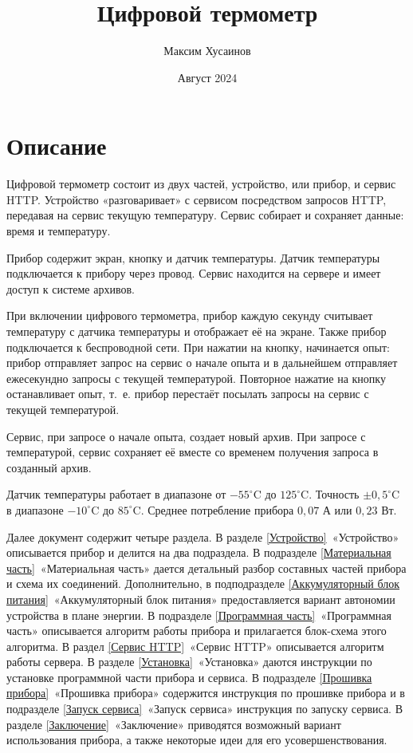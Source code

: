 \documentclass[12pt]{extarticle}
\title{Цифровой термометр}
\date{Август 2024}
\author{Максим Хусаинов}
\begin{document}
\maketitle

\section{Описание}
Цифровой термометр состоит из двух частей, устройство, или прибор, и сервис HTTP. Устройство «разговаривает» с сервисом посредством запросов HTTP, передавая на сервис текущую температуру. Сервис собирает и сохраняет данные: время и температуру.

Прибор содержит экран, кнопку и датчик температуры. Датчик температуры подключается к прибору через провод. Сервис находится на сервере и имеет доступ к системе архивов.

При включении цифрового термометра, прибор каждую секунду считывает температуру с датчика температуры и отображает её на экране. Также прибор подключается к беспроводной сети. При нажатии на кнопку, начинается опыт: прибор отправляет запрос на сервис о начале опыта и в дальнейшем отправляет ежесекундно запросы с текущей температурой. Повторное нажатие на кнопку останавливает опыт, т.~е. прибор перестаёт посылать запросы на сервис с текущей температурой.

Сервис, при запросе о начале опыта, создает новый архив. При запросе с температурой, сервис сохраняет её вместе со временем получения запроса в созданный архив.

Датчик температуры работает в диапазоне от $-55^{\circ}$C до $125^{\circ}$C. Точность $\pm 0{,}5^{\circ}$C в диапазоне $-10^{\circ}$C до $85^{\circ}$C. 
Среднее потребление прибора $0{,}07$ А или $0{,}23$ Вт.

Далее документ содержит четыре раздела. В разделе \ref{Устройство}~«Устройство» описывается прибор и делится на два подраздела. В подразделе \ref{Материальная часть}~«Материальная часть» дается детальный разбор составных частей прибора и схема их соединений. Дополнительно, в подподразделе \ref{Аккумуляторный блок питания}~«Аккумуляторный блок питания» предоставляется вариант автономии устройства в плане энергии. В подразделе \ref{Программная часть}~«Программная часть» описывается алгоритм работы прибора и прилагается блок-схема этого алгоритма. В раздел \ref{Сервис HTTP}~«Сервис HTTP» описывается алгоритм работы сервера. В разделе \ref{Установка}~«Установка» даются инструкции по установке программной части прибора и сервиса. В подразделе \ref{Прошивка прибора}~«Прошивка прибора» содержится инструкция по прошивке прибора и в подразделе \ref{Запуск сервиса}~«Запуск сервиса» инструкция по запуску сервиса. В разделе \ref{Заключение}~«Заключение» приводятся возможный вариант использования прибора, а также некоторые идеи для его усовершенствования.
\end{document}
